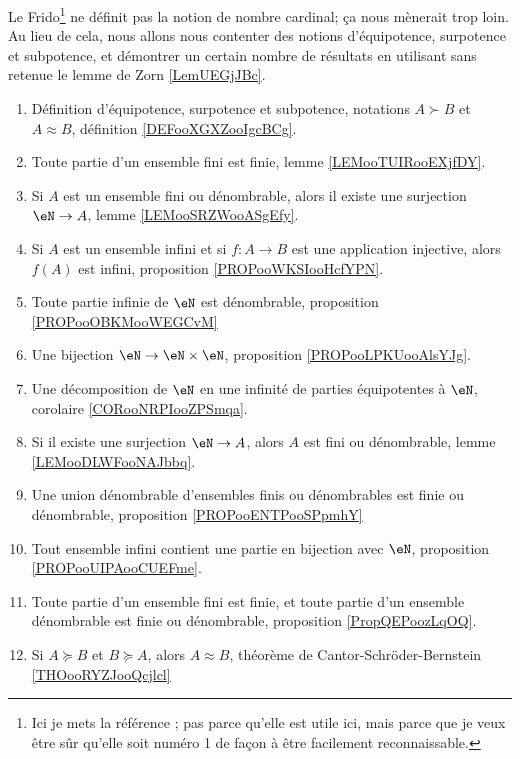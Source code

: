 

Le Frido\footnote{Ici je mets la référence \cite{MonCerveau}; pas parce qu'elle est utile ici, mais parce que je veux être sûr qu'elle soit numéro 1 de façon à être facilement reconnaissable.} ne définit pas la notion de nombre cardinal; ça nous mènerait trop loin. Au lieu de cela, nous allons nous contenter des notions d'équipotence, surpotence et subpotence, et démontrer un certain nombre de résultats en utilisant sans retenue le lemme de Zorn \ref{LemUEGjJBc}.
\begin{enumerate}
	\item
	      Définition d'équipotence, surpotence et subpotence, notations \( A\succ B\) et \( A\approx B\), définition \ref{DEFooXGXZooIgcBCg}.
	\item
	      Toute partie d'un ensemble fini est finie, lemme \ref{LEMooTUIRooEXjfDY}.
	\item
	      Si \( A\) est un ensemble fini ou dénombrable, alors il existe une surjection \( \eN\to A\), lemme \ref{LEMooSRZWooASgEfy}.
	\item
	      Si \( A\) est un ensemble infini et si \( f\colon A\to B\) est une application injective, alors \( f(A)\) est infini, proposition \ref{PROPooWKSIooHcfYPN}.
	\item
	      Toute partie infinie de \( \eN\) est dénombrable, proposition \ref{PROPooOBKMooWEGCvM}
	\item
	      Une bijection \( \eN\to \eN\times \eN\), proposition \ref{PROPooLPKUooAlsYJg}.
	\item
	      Une décomposition de \( \eN\) en une infinité de parties équipotentes à \( \eN\), corolaire \ref{CORooNRPIooZPSmqa}.
	\item
	      Si il existe une surjection \( \eN\to A\), alors \( A\) est fini ou dénombrable, lemme \ref{LEMooDLWFooNAJbbq}.
	\item
	      Une union dénombrable d'ensembles finis ou dénombrables est finie ou dénombrable, proposition \ref{PROPooENTPooSPpmhY}
	\item
	      Tout ensemble infini contient une partie en bijection avec \( \eN\), proposition \ref{PROPooUIPAooCUEFme}.
	\item
	      Toute partie d'un ensemble fini est finie, et toute partie d'un ensemble dénombrable est finie ou dénombrable, proposition \ref{PropQEPoozLqOQ}.
	\item
	      Si \( A\succeq B\) et \( B\succeq A\), alors \( A\approx B\), théorème de Cantor-Schröder-Bernstein \ref{THOooRYZJooQcjlcl}

\end{enumerate}

